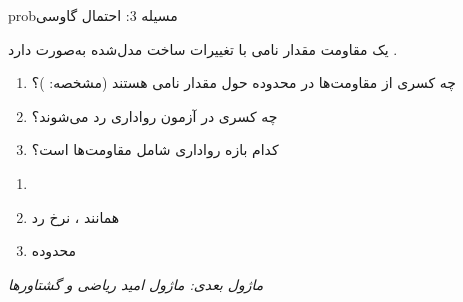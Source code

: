 \begin{PSbox}[unbreakable]{prob}{مسیله 3: احتمال گاوسی}

یک مقاومت مقدار نامی \lr{1000\ensuremath{\Omega}} با تغییرات ساخت مدل‌شده به‌صورت  دارد \lr{(\ensuremath{\sigma} = 5\ensuremath{\Omega})}.

\begin{enumerate}
\def\labelenumi{(\alph{enumi})}
\tightlist
\item
  چه کسری از مقاومت‌ها در محدوده \lr{\ensuremath{\pm}10\ensuremath{\Omega}} حول مقدار نامی هستند (مشخصه: )؟
\item
  چه کسری در آزمون رواداری  رد می‌شوند؟
\item
  کدام بازه رواداری شامل  مقاومت‌ها است؟
\end{enumerate}

\PSsolution{} 

\begin{enumerate}
\def\labelenumi{(\alph{enumi})}
\tightlist
\item
\item
   همانند ، نرخ رد 
\item
  \lr{\ensuremath{\pm}3\ensuremath{\sigma} = \ensuremath{\pm}15\ensuremath{\Omega} \ensuremath{\to}} محدوده \lr{[985, 1015]\ensuremath{\Omega}}
\end{enumerate}

\emph{ماژول بعدی: {ماژول  امید ریاضی و گشتاورها}}\PSbr{}

\end{PSbox}
